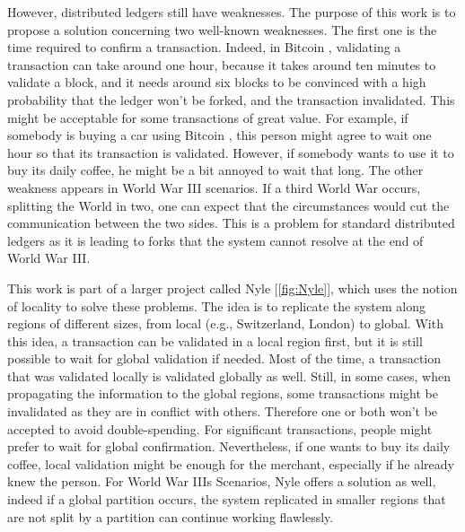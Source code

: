 \documentclass[a4paper,11pt,twoside=semi,openright]{report}
\begin{document}
However, distributed ledgers still have weaknesses. The purpose of this
work is to propose a solution concerning two well-known weaknesses. The first
one is the time required to confirm a transaction. Indeed, in Bitcoin
\cite{Nakamoto2009}, validating a transaction can take around one hour, because
it takes around ten minutes to validate a block, and it needs around six blocks
to be convinced with a high probability that the ledger won't be forked, and
the transaction invalidated. This might be acceptable for some transactions of great
value. For example, if somebody is buying a car using Bitcoin
\cite{Nakamoto2009}, this person might agree to wait one hour so that its
transaction is validated. However, if somebody wants to use it to buy its daily
coffee, he might be a bit annoyed to wait that long. The other weakness
appears in World War III scenarios. If a third World War occurs, splitting the
World in two, one can expect that the circumstances would cut the communication
between the two sides. This is a problem for standard distributed ledgers as it
is leading to forks that the system cannot resolve at the end of World War III.

This work is part of a larger project called Nyle [\autoref{fig:Nyle}], which
uses the notion of locality to solve these problems. The idea is to replicate
the system along regions of different sizes, from local (e.g., Switzerland,
London) to global.  With this idea, a transaction can be validated in a local
region first, but it is still possible to wait for global validation if needed.
Most of the time, a transaction that was validated locally is validated
globally as well. Still, in some cases, when propagating the information to the
global regions, some transactions might be invalidated as they are in conflict
with others. Therefore one or both won't be accepted to avoid double-spending.
For significant transactions, people might prefer to wait for global
confirmation. Nevertheless, if one wants to buy its daily coffee, local
validation might be enough for the merchant, especially if he already knew the
person. For World War IIIs Scenarios, Nyle offers a solution as well, indeed if
a global partition occurs, the system replicated in smaller regions that are
not split by a partition can continue working flawlessly. 
\end{document}
